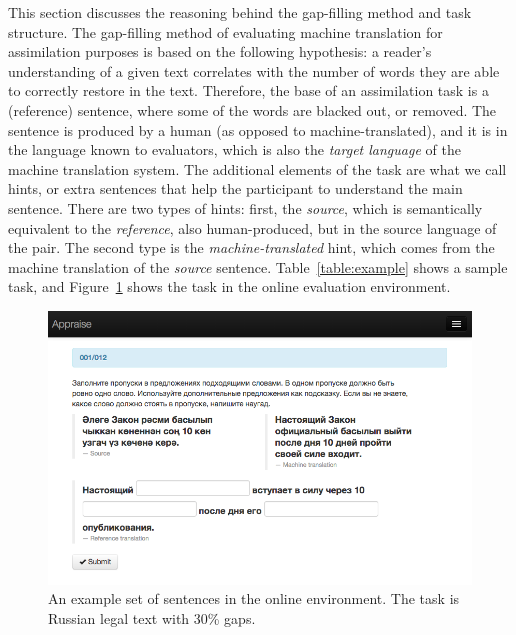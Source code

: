 \documentclass[11pt]{article}
\newcommand{\comment}[1]{}
\begin{document}
This section discusses the reasoning behind the gap-filling method and task structure. The gap-filling method 
of evaluating machine translation for assimilation purposes is based on the following hypothesis: a reader's understanding 
of a given text correlates with the number of words they are able to correctly restore in the text. Therefore, the 
base of an assimilation task is a (reference) sentence, where some of the words are blacked out, or removed. The sentence 
is produced by a human (as opposed to machine-translated), and it is in the language known to evaluators, which is also 
the \emph{target language} of the machine translation system.
The additional elements of the task are what we call hints, or extra sentences that help the participant to understand 
the main sentence. There are two types of hints: first, the \emph{source}, which is semantically equivalent to the \emph{reference}, 
also human-produced, but in the source language of the pair. The second type is the \emph{machine-translated} hint, which 
comes from the machine translation of the \emph{source} sentence. Table~\ref{table:example} shows a sample task, and Figure~\ref{figure:screenshot} shows the task in the online evaluation environment.

\begin{figure}
  \centering
\includegraphics[width=1.0\textwidth,resolution=144]{appraise-scr}
 \caption{An example set of sentences in the online environment. The task is Russian legal text with 30\% gaps.}
\label{figure:screenshot}
\end{figure}
\end{document}
